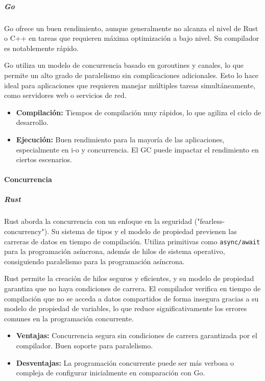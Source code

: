 \subparagraph{Go}
Go ofrece un buen rendimiento, aunque generalmente no alcanza el nivel de Rust o C++ en tareas que requieren máxima optimización a bajo nivel. Su compilador es notablemente rápido.

Go utiliza un modelo de concurrencia basado en \glspl{goroutine} y canales, lo que permite un alto grado de paralelismo sin complicaciones adicionales. Esto lo hace ideal para aplicaciones que requieren manejar múltiples tareas simultáneamente, como servidores web o servicios de red.

\begin{itemize}
    \item \textbf{Compilación:} Tiempos de compilación muy rápidos, lo que agiliza el ciclo de desarrollo.
    \item \textbf{Ejecución:} Buen rendimiento para la mayoría de las aplicaciones, especialmente en \acrshort{i-o} y concurrencia. El GC puede impactar el rendimiento en ciertos escenarios.
\end{itemize}

\paragraph{Concurrencia}
\subparagraph{Rust}
Rust aborda la concurrencia con un enfoque en la seguridad ("\gls{fearless-concurrency}"). Su sistema de tipos y el modelo de propiedad previenen las carreras de datos en tiempo de compilación. Utiliza primitivas como \texttt{async/await} para la programación asíncrona, además de hilos de sistema operativo, consiguiendo paralelismo para la programación asíncrona.

Rust permite la creación de hilos seguros y eficientes, y su modelo de propiedad garantiza que no haya condiciones de carrera. El compilador verifica en tiempo de compilación que no se acceda a datos compartidos de forma insegura gracias a su modelo de propiedad de variables, lo que reduce significativamente los errores comunes en la programación concurrente.
\begin{itemize}
    \item \textbf{Ventajas:} Concurrencia segura sin condiciones de carrera garantizada por el compilador. Buen soporte para paralelismo.
    \item \textbf{Desventajas:} La programación concurrente puede ser más verbosa o compleja de configurar inicialmente en comparación con Go.
\end{itemize}


